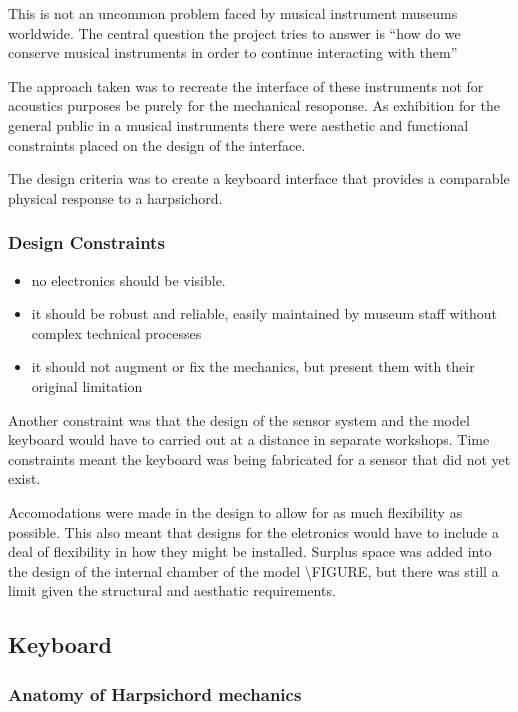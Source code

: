This is not an uncommon problem faced by musical instrument museums
worldwide. The central question the project tries to answer is ``how do
we conserve musical instruments in order to continue interacting with
them''

The approach taken was to recreate the interface of these instruments
not for acoustics purposes be purely for the mechanical resoponse. As
exhibition for the general public in a musical instruments there were
aesthetic and functional constraints placed on the design of the
interface.

The design criteria was to create a keyboard interface that provides a
comparable physical response to a harpsichord.

\subsubsection{Design Constraints}\label{design-constraints}

\begin{itemize}
\item
  no electronics should be visible.
\item
  it should be robust and reliable, easily maintained by museum staff
  without complex technical processes
\item
  it should not augment or fix the mechanics, but present them with
  their original limitation
\end{itemize}

Another constraint was that the design of the sensor system and the
model keyboard would have to carried out at a distance in separate
workshops. Time constraints meant the keyboard was being fabricated for
a sensor that did not yet exist.

Accomodations were made in the design to allow for as much flexibility
as possible. This also meant that designs for the eletronics would have
to include a deal of flexibility in how they might be installed. Surplus
space was added into the design of the internal chamber of the model
\textbackslash FIGURE, but there was still a limit given the structural
and aesthatic requirements.

\subsection{Keyboard}\label{keyboard}

\subsubsection{Anatomy of Harpsichord
mechanics}\label{anatomy-of-harpsichord-mechanics}

